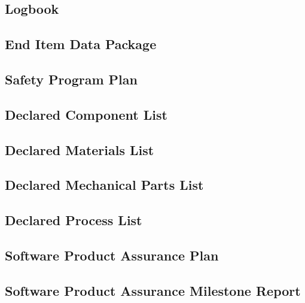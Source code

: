\subsection{Logbook}
\label{sec:Logbook}


\subsection{End Item Data Package}
\label{sec:End Item Data Package}


\subsection{Safety Program Plan}
\label{sec:Safety Program Plan}


\subsection{Declared Component List}
\label{sec:Declared Component List}


\subsection{Declared Materials List}
\label{sec:Declared Materials List}


\subsection{Declared Mechanical Parts List}
\label{sec:Declared Mechanical Parts List}


\subsection{Declared Process List}
\label{sec:Declared Process List}


\subsection{Software Product Assurance Plan}
\label{sec:Software Product Assurance Plan}


\subsection{Software Product Assurance Milestone Report}
\label{sec:Software Product Assurance Milestone Report}

\clearpage

